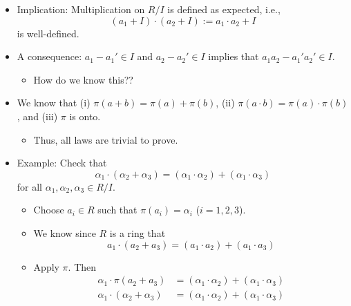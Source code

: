 \documentclass[../notes.tex]{subfiles}
\begin{document}
\begin{itemize}
    \item Implication: Multiplication on $R/I$ is defined as expected, i.e.,
    \begin{equation*}
        (a_1+I)\cdot(a_2+I) := a_1\cdot a_2+I
    \end{equation*}
    is well-defined.
    \item A consequence: $a_1-a_1'\in I$ and $a_2-a_2'\in I$ implies that $a_1a_2-a_1'a_2'\in I$.
    \begin{itemize}
        \item How do we know this??
    \end{itemize}
    \item We know that (i) $\pi(a+b)=\pi(a)+\pi(b)$, (ii) $\pi(a\cdot b)=\pi(a)\cdot\pi(b)$, and (iii) $\pi$ is onto.
    \begin{itemize}
        \item Thus, all laws are trivial to prove.
    \end{itemize}
    \item Example: Check that
    \begin{equation*}
        \alpha_1\cdot(\alpha_2+\alpha_3) = (\alpha_1\cdot\alpha_2)+(\alpha_1\cdot\alpha_3)
    \end{equation*}
    for all $\alpha_1,\alpha_2,\alpha_3\in R/I$.
    \begin{itemize}
        \item Choose $a_i\in R$ such that $\pi(a_i)=\alpha_i$ ($i=1,2,3$).
        \item We know since $R$ is a ring that
        \begin{equation*}
            a_1\cdot(a_2+a_3) = (a_1\cdot a_2)+(a_1\cdot a_3)
        \end{equation*}
        \item Apply $\pi$. Then
        \begin{align*}
            \alpha_1\cdot\pi(a_2+a_3) &= (\alpha_1\cdot\alpha_2)+(\alpha_1\cdot\alpha_3)\\
            \alpha_1\cdot(\alpha_2+\alpha_3) &= (\alpha_1\cdot\alpha_2)+(\alpha_1\cdot\alpha_3)
        \end{align*}
    \end{itemize}
\end{itemize}
\end{document}

